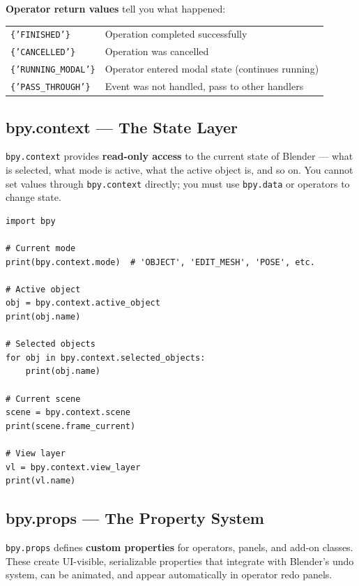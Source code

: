 \textbf{Operator return values} tell you what happened:

\begin{center}
\begin{tabularx}{\textwidth}{L{4cm}X}
\toprule
{}
 &  \\
\midrule
\texttt{\{'FINISHED'\}} & Operation completed successfully \\
\texttt{\{'CANCELLED'\}} & Operation was cancelled \\
\texttt{\{'RUNNING\_MODAL'\}} & Operator entered modal state (continues running) \\
\texttt{\{'PASS\_THROUGH'\}} & Event was not handled, pass to other handlers \\
\bottomrule
\end{tabularx}
\end{center}

\subsection{bpy.context --- The State Layer}

\texttt{bpy.context} provides \textbf{read-only access} to the current state of Blender --- what is selected, what mode is active, what the active object is, and so on. You cannot set values through \texttt{bpy.context} directly; you must use \texttt{bpy.data} or operators to change state.

\begin{lstlisting}
import bpy

# Current mode
print(bpy.context.mode)  # 'OBJECT', 'EDIT_MESH', 'POSE', etc.

# Active object
obj = bpy.context.active_object
print(obj.name)

# Selected objects
for obj in bpy.context.selected_objects:
    print(obj.name)

# Current scene
scene = bpy.context.scene
print(scene.frame_current)

# View layer
vl = bpy.context.view_layer
print(vl.name)
\end{lstlisting}

\subsection{bpy.props --- The Property System}

\texttt{bpy.props} defines \textbf{custom properties} for operators, panels, and add-on classes. These create UI-visible, serializable properties that integrate with Blender's undo system, can be animated, and appear automatically in operator redo panels.

